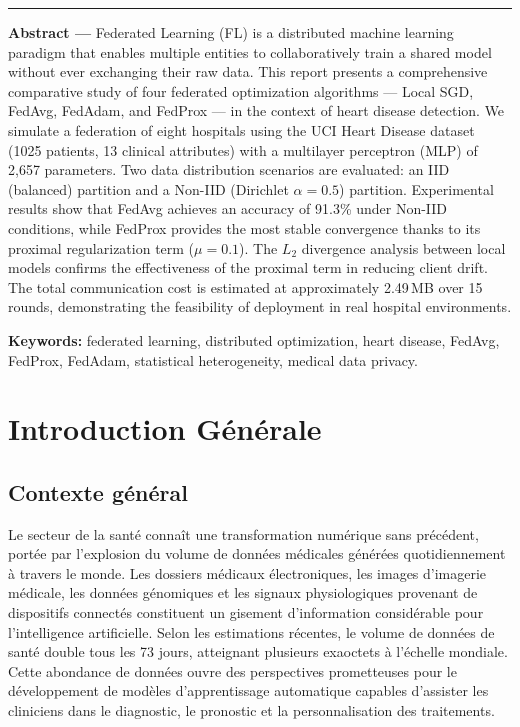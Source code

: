 \documentclass[12pt,a4paper]{report}
\begin{document}
\bigskip
\hrule
\bigskip

\textbf{Abstract ---} Federated Learning (FL) is a distributed machine learning paradigm that enables multiple entities to collaboratively train a shared model without ever exchanging their raw data. This report presents a comprehensive comparative study of four federated optimization algorithms --- Local SGD, FedAvg, FedAdam, and FedProx --- in the context of heart disease detection. We simulate a federation of eight hospitals using the UCI Heart Disease dataset (1025 patients, 13 clinical attributes) with a multilayer perceptron (MLP) of 2,657 parameters. Two data distribution scenarios are evaluated: an IID (balanced) partition and a Non-IID (Dirichlet $\alpha = 0.5$) partition. Experimental results show that FedAvg achieves an accuracy of 91.3\% under Non-IID conditions, while FedProx provides the most stable convergence thanks to its proximal regularization term ($\mu = 0.1$). The $L_2$ divergence analysis between local models confirms the effectiveness of the proximal term in reducing client drift. The total communication cost is estimated at approximately 2.49\,MB over 15 rounds, demonstrating the feasibility of deployment in real hospital environments.

\textbf{Keywords:} federated learning, distributed optimization, heart disease, FedAvg, FedProx, FedAdam, statistical heterogeneity, medical data privacy.

\tableofcontents
\listoffigures
\listoftables

\chapter{Introduction G\'{e}n\'{e}rale}

\section{Contexte g\'{e}n\'{e}ral}

Le secteur de la sant\'{e} conna\^{i}t une transformation num\'{e}rique sans pr\'{e}c\'{e}dent, port\'{e}e par l'explosion du volume de donn\'{e}es m\'{e}dicales g\'{e}n\'{e}r\'{e}es quotidiennement \`{a} travers le monde. Les dossiers m\'{e}dicaux \'{e}lectroniques, les images d'imagerie m\'{e}dicale, les donn\'{e}es g\'{e}nomiques et les signaux physiologiques provenant de dispositifs connect\'{e}s constituent un gisement d'information consid\'{e}rable pour l'intelligence artificielle. Selon les estimations r\'{e}centes, le volume de donn\'{e}es de sant\'{e} double tous les 73 jours, atteignant plusieurs exaoctets \`{a} l'\'{e}chelle mondiale. Cette abondance de donn\'{e}es ouvre des perspectives prometteuses pour le d\'{e}veloppement de mod\`{e}les d'apprentissage automatique capables d'assister les cliniciens dans le diagnostic, le pronostic et la personnalisation des traitements.
\end{document}
